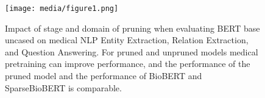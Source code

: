 \begin{figure}[!
t]
    \centering
    \texttt{[image: media/figure1.png]}
    \vspace{-1.2em}
    \begin{comment}
\begin{tikzpicture}
 \scalebox{0.5}{ 
    \begin{axis}[
        width  = .9*\textwidth,
        height = 8cm,
        major x tick style = transparent,
        ybar=2*\pgflinewidth,
        bar width=14pt,
        ymajorgrids = true,
        ylabel = {Task Metric},
        symbolic x coords={Overall,Entity,Relation,Question Answering},
        xtick = data,
        scaled y ticks = false,
        enlarge x limits=0.15,
        ymin=60,
        legend cell align=left,
        legend style={
                at={(1,1.05)},
                anchor=south east,
                column sep=2ex
        }
    ]
        \addplot[style={bblue,fill=bblue,mark=none}]
            coordinates {(Overall,77.76) (Entity, 84.45) (Relation,86.86) (Question Answering,61.97)};
        \addplot[style={brown,fill=brown,mark=none}]
            coordinates {(Overall,80.62) (Entity, 85.96) (Relation,87.56) (Question Answering,68.33)};
        \addplot[style={rred,fill=rred,mark=none}]
            coordinates {(Overall, 75.28)(Entity, 76.12) (Relation,84.36) (Question Answering,65.39)};

        \addplot[style={ggreen,fill=ggreen,mark=none}]
             coordinates {(Overall,78.27) (Entity,80.84) (Relation,85.54) (Question Answering,68.44)};

        \addplot[style={ppurple,fill=ppurple,mark=none}]
             coordinates {(Overall,80.42) (Entity,86.36) (Relation,88.57) (Question Answering,66.33)};
        \addplot[style={oorange,fill=oorange
        ,mark=none}]
             coordinates {(Overall,78.27) (Entity,82.50) (Relation,86.60) (Question Answering,65.71)};
        \legend{No Pruning(BERT), No Pruning + Medical Pretraining (BioBERT), Finetuning Pruning, General Pretraining Pruning (Sparse*BERT), General Pretraining Pruning + Medical Pretraining (SparseBioBERT), Medical Pretraining Pruning}
    \end{axis}}
\end{tikzpicture}
\end{comment}
\caption{Impact of stage and domain of pruning when evaluating BERT base uncased on medical NLP Entity Extraction, Relation Extraction, and Question Answering. For pruned and unpruned models medical pretraining can improve performance, and the performance of the pruned model and the performance of BioBERT and SparseBioBERT is comparable.}
\label{fig:sparse_transfer_categorical}
\end{figure}
